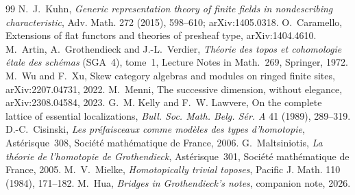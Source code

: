 \begin{thebibliography}{99}
 N.~J.~Kuhn, \emph{Generic representation theory of finite fields in nondescribing characteristic}, Adv. Math. 272 (2015), 598--610; arXiv:1405.0318.
 O.~Caramello, Extensions of flat functors and theories of presheaf type, arXiv:1404.4610.
 M.~Artin, A.~Grothendieck and J.-L.~Verdier, \emph{Théorie des topos et cohomologie étale des schémas} (SGA~4), tome~1, Lecture Notes in Math.\ 269, Springer, 1972.
 M.~Wu and F.~Xu, Skew category algebras and modules on ringed finite sites, arXiv:2207.04731, 2022.
 M.~Menni, The successive dimension, without elegance, arXiv:2308.04584, 2023.
 G.~M. Kelly and F.~W. Lawvere, On the complete lattice of essential localizations, \emph{Bull. Soc. Math. Belg. S\'er. A} 41 (1989), 289--319.
 D.-C.~Cisinski, \emph{Les préfaisceaux comme modèles des types d'homotopie}, Astérisque~308, Société mathématique de France, 2006.
 G.~Maltsiniotis, \emph{La théorie de l'homotopie de Grothendieck}, Astérisque~301, Société mathématique de France, 2005.
 M.~V.~Mielke, \emph{Homotopically trivial toposes}, Pacific J. Math. 110 (1984), 171--182.
 M.~Hua, \emph{Bridges in Grothendieck's notes}, companion note, 2026.
\end{thebibliography}
